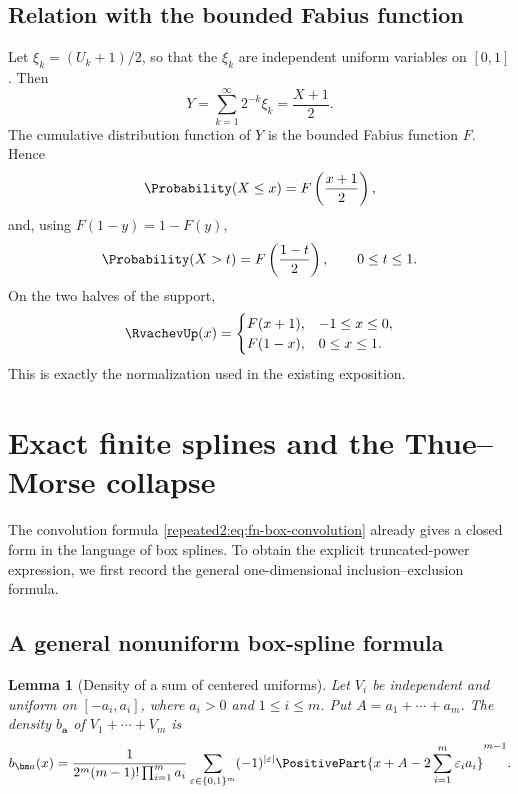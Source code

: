 \documentclass[11pt,oneside]{article}
\newtheorem{lemma}[lemma]{Lemma}
\theoremstyle{definition}
\theoremstyle{remark}
\begin{document}
\subsection{Relation with the bounded Fabius function}

Let $\xi_k=(U_k+1)/2$, so that the $\xi_k$ are independent uniform variables on $[0,1]$.
Then
\begin{equation}
 Y=\sum_{k=1}^{\infty}2^{-k}\xi_k=\frac{X+1}{2}.
 \label{repeated2:eq:Y-X-relation}
\end{equation}
The cumulative distribution function of $Y$ is the bounded Fabius function $F$.  Hence
\begin{equation}
 \Probability(X\le x)=F\left(\frac{x+1}{2}\right),
 \label{repeated2:eq:X-cdf-F}
\end{equation}
and, using $F(1-y)=1-F(y)$,
\begin{equation}
 \Probability(X>t)=F\left(\frac{1-t}{2}\right),\qquad 0\le t\le1.
 \label{repeated2:eq:X-tail-F}
\end{equation}
On the two halves of the support,
\begin{equation}
 \RvachevUp(x)=
 \begin{cases}
 F(x+1),&-1\le x\le0,\\
 F(1-x),&0\le x\le1.
 \end{cases}
 \label{repeated2:eq:up-F-relation}
\end{equation}
This is exactly the normalization used in the existing exposition.

\section{Exact finite splines and the Thue--Morse collapse}
\label{repeated2:sec:exact-spline}

The convolution formula \eqref{repeated2:eq:fn-box-convolution} already gives a closed form in the
language of box splines.  To obtain the explicit truncated-power expression, we first
record the general one-dimensional inclusion--exclusion formula.

\subsection{A general nonuniform box-spline formula}

\begin{lemma}[Density of a sum of centered uniforms]
\label{repeated2:lem:general-box-spline}
Let $V_i$ be independent and uniform on $[-a_i,a_i]$, where $a_i>0$ and
$1\le i\le m$.  Put $A=a_1+\cdots+a_m$.  The density $b_{\bm a}$ of
$V_1+\cdots+V_m$ is
\begin{equation}
 b_{\bm a}(x)=
 \frac{1}{2^m(m-1)!\prod_{i=1}^{m}a_i}
 \sum_{\varepsilon\in\{0,1\}^m}(-1)^{|\varepsilon|}
 \PositivePart{x+A-2\sum_{i=1}^{m}\varepsilon_i a_i}^{m-1}.
 \label{repeated2:eq:general-box-spline}
\end{equation}
\end{lemma}
\end{document}

